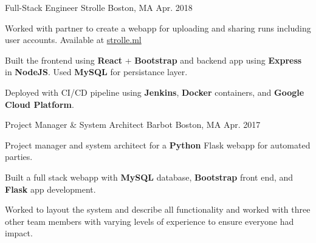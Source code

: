 

\begin{cventries}

  \cventry
    {Full-Stack Engineer} %
    {Strolle} %
    {Boston, MA} %
    {Apr. 2018} %
    {
      \begin{cvitems} %
        \item Worked with partner to create a webapp for uploading and sharing runs including user accounts. Available at \href{https://strolle.ml/}{strolle.ml} 
        \item Built the frontend using \textbf{React} + \textbf{Bootstrap} and backend app using \textbf{Express} in \textbf{NodeJS}. Used \textbf{MySQL} for persistance layer.
        \item Deployed with CI/CD pipeline using \textbf{Jenkins}, \textbf{Docker} containers, and \textbf{Google Cloud Platform}.
      \end{cvitems}
    }

  \cventry
    {Project Manager \& System Architect} %
    {Barbot} %
    {Boston, MA} %
    {Apr. 2017} %
    {
      \begin{cvitems} %
        \item Project manager and system architect for a \textbf{Python} Flask webapp for automated parties. 
	      \item Built a full stack webapp with \textbf{MySQL} database, \textbf{Bootstrap} front end, and \textbf{Flask} app development. 
	      \item Worked to layout the system and describe all functionality and worked with three other team members with varying levels of experience to ensure everyone had impact. 
      \end{cvitems}
    }

\end{cventries}
